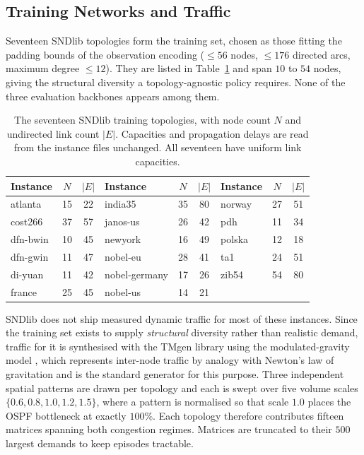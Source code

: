 \subsection{Training Networks and Traffic}
\label{sec:setup-train}

Seventeen SNDlib topologies form the training set, chosen as those fitting the
padding bounds of the observation encoding ($\leq 56$ nodes, $\leq 176$ directed
arcs, maximum degree $\leq 12$). They are listed in Table~\ref{tab:train-topos}
and span $10$ to $54$ nodes, giving the structural diversity a topology-agnostic
policy requires. None of the three evaluation backbones appears among them.

\begin{table}[h]
\centering
\small
\begin{tabular}{lcc|lcc|lcc}
\hline
Instance & $N$ & $|E|$ & Instance & $N$ & $|E|$ & Instance & $N$ & $|E|$ \\
\hline
atlanta   & 15 & 22 & india35       & 35 & 80 & norway & 27 & 51 \\
cost266   & 37 & 57 & janos-us      & 26 & 42 & pdh    & 11 & 34 \\
dfn-bwin  & 10 & 45 & newyork       & 16 & 49 & polska & 12 & 18 \\
dfn-gwin  & 11 & 47 & nobel-eu      & 28 & 41 & ta1    & 24 & 51 \\
di-yuan   & 11 & 42 & nobel-germany & 17 & 26 & zib54  & 54 & 80 \\
france    & 25 & 45 & nobel-us      & 14 & 21 &        &    &    \\
\hline
\end{tabular}
\caption{The seventeen SNDlib training topologies, with node count $N$ and
undirected link count $|E|$. Capacities and propagation delays are read from the
instance files unchanged. All seventeen have uniform link capacities.}
\label{tab:train-topos}
\end{table}

SNDlib does not ship measured dynamic traffic for most of these instances. Since
the training set exists to supply \emph{structural} diversity rather than
realistic demand, traffic for it is synthesised with the TMgen library using the
modulated-gravity model \cite{internet-traffic}, which represents inter-node
traffic by analogy with Newton's law of gravitation and is the standard
generator for this purpose. Three independent spatial patterns are drawn per
topology and each is swept over five volume scales
$\{0.6, 0.8, 1.0, 1.2, 1.5\}$, where a pattern is normalised so that scale $1.0$
places the OSPF bottleneck at exactly $100\%$. Each topology therefore
contributes fifteen matrices spanning both congestion regimes. Matrices are
truncated to their $500$ largest demands to keep episodes tractable.

